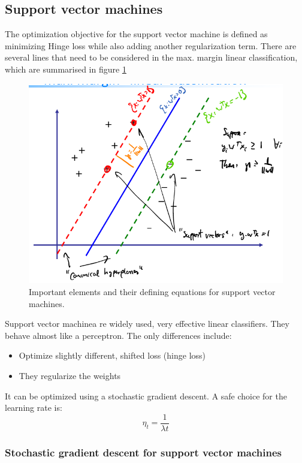 \documentclass[a4paper,10pt,twoside]{article}
\begin{document}
\subsection{Support vector machines}

The optimization objective for the support vector machine is defined as minimizing Hinge loss while also adding another regularization term. There are several lines that need to be considered in the max. margin linear classification, which are summarised in figure \ref{planes_svm}

\begin{figure}
    \centering
    \includegraphics[width=.8\textwidth]{figures/max_margin_decision_boundaries.png}
    \caption{Important elements and their defining equations for support vector machines.}
    \label{planes_svm}
\end{figure}

Support vector machinea re widely used, very effective linear classifiers. They behave almost like a perceptron. The only differences include:
\begin{itemize}
    \item Optimize slightly different, shifted loss (hinge loss)
    \item They regularize the weights
\end{itemize}
It can be optimized using a stochastic gradient descent. A safe choice for the learning rate is:
\begin{equation*}
    \eta_t=\frac{1}{\lambda t}
\end{equation*}

\subsubsection{Stochastic gradient descent for support vector machines}
\end{document}
